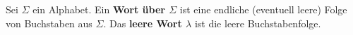 %
%
Sei \(\Sigma\) ein Alphabet. Ein \textbf{Wort über \(\Sigma\)} ist eine endliche (eventuell leere) Folge von Buchstaben aus \(\Sigma\). Das \textbf{leere Wort \(\lambda\)} ist die leere Buchstabenfolge.

